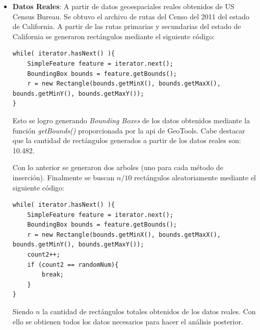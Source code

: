 \documentclass[letterpaper,12pt]{article}
\begin{document}
\begin{itemize}
\item \textbf{Datos Reales}: A partir de datos geoespaciales reales obtenidos de US Census Bureau. Se obtuvo el archivo de rutas del Censo del 2011 del estado de California.  A partir de las rutas primarias y secundarias del estado de California se generaron rectángulos mediante el siguiente código:
\lstset{language=Java, breaklines=true, basicstyle=\footnotesize}
\begin{lstlisting}[frame=single]
while( iterator.hasNext() ){
	SimpleFeature feature = iterator.next();
	BoundingBox bounds = feature.getBounds();
	r = new Rectangle(bounds.getMinX(), bounds.getMaxX(), bounds.getMinY(), bounds.getMaxY());
}
\end{lstlisting}

Esto se logro generando \textit{Bounding Boxes} de los datos obtenidos mediante la función \textit{getBounds()} proporcionada por la api de GeoTools. Cabe destacar que la cantidad de rectángulos generados a partir de los datos reales son: 10.482.

Con lo anterior se generaron dos arboles (uno para cada método de inserción). Finalmente se buscan $n/10$ rectángulos aleatoriamente mediante el siguiente código:
\lstset{language=Java, breaklines=true, basicstyle=\footnotesize}
\begin{lstlisting}[frame=single]
while( iterator.hasNext() ){
	SimpleFeature feature = iterator.next();
	BoundingBox bounds = feature.getBounds();
	r = new Rectangle(bounds.getMinX(), bounds.getMaxX(), bounds.getMinY(), bounds.getMaxY());
	count2++;
  	if (count2 == randomNum){
		break;
  	}
}
\end{lstlisting}

Siendo $n$ la cantidad de rectángulos totales obtenidos de los datos reales. Con ello se obtienen todos los datos necesarios para hacer el análisis posterior.

\end{itemize}
\end{document}
